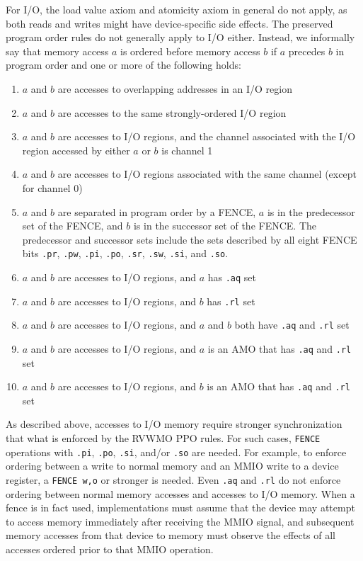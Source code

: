 For I/O, the load value axiom and atomicity axiom in general do not apply, as both reads and writes might have device-specific side effects.
The preserved program order rules do not generally apply to I/O either.
Instead, we informally say that memory access $a$ is ordered before memory access $b$ if $a$ precedes $b$ in program order and one or more of the following holds:
\begin{enumerate}
  \item $a$ and $b$ are accesses to overlapping addresses in an I/O region
  \item $a$ and $b$ are accesses to the same strongly-ordered I/O region
  \item $a$ and $b$ are accesses to I/O regions, and the channel associated with the I/O region accessed by either $a$ or $b$ is channel 1
  \item $a$ and $b$ are accesses to I/O regions associated with the same channel (except for channel 0)
  \item $a$ and $b$ are separated in program order by a FENCE, $a$ is in the predecessor set of the FENCE, and $b$ is in the successor set of the FENCE.  The predecessor and successor sets include the sets described by all eight FENCE bits {\tt .pr}, {\tt .pw}, {\tt .pi}, {\tt .po}, {\tt .sr}, {\tt .sw}, {\tt .si}, and {\tt .so}.
  \item $a$ and $b$ are accesses to I/O regions, and $a$ has {\tt .aq} set
  \item $a$ and $b$ are accesses to I/O regions, and $b$ has {\tt .rl} set
  \item $a$ and $b$ are accesses to I/O regions, and $a$ and $b$ both have {\tt .aq} and {\tt .rl} set
  \item $a$ and $b$ are accesses to I/O regions, and $a$ is an AMO that has {\tt .aq} and {\tt .rl} set
  \item $a$ and $b$ are accesses to I/O regions, and $b$ is an AMO that has {\tt .aq} and {\tt .rl} set
\end{enumerate}

As described above, accesses to I/O memory require stronger synchronization that what is enforced by the RVWMO PPO rules.
For such cases, {\tt FENCE} operations with {\tt .pi}, {\tt .po}, {\tt .si}, and/or {\tt .so} are needed.
For example, to enforce ordering between a write to normal memory and an MMIO write to a device register, a {\tt FENCE w,o} or stronger is needed.
Even {\tt .aq} and {\tt .rl} do not enforce ordering between normal memory accesses and accesses to I/O memory.
When a fence is in fact used, implementations must assume that the device may attempt to access memory immediately after receiving the MMIO signal, and subsequent memory accesses from that device to memory must observe the effects of all accesses ordered prior to that MMIO operation.

